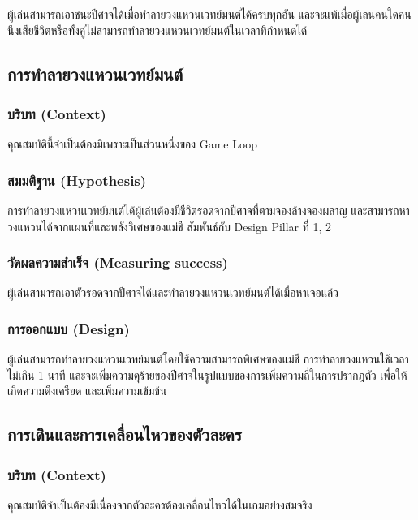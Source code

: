 ผู้เล่นสามารถเอาชนะปีศาจได้เมื่อทำลายวงแหวนเวทย์มนต์ได้ครบทุกอัน และจะแพ้เมื่อผู้เลนคนใดคนนึงเสียชีวิตหรือทั้งคู่ไม่สามารถทำลายวงแหวนเวทย์มนต์ในเวลาที่กำหนดได้

\subsection{การทำลายวงแหวนเวทย์มนต์}

\subsubsection{บริบท (Context)}

คุณสมบัตินี้จำเป็นต้องมีเพราะเป็นส่วนหนึ่งของ Game Loop

\subsubsection{สมมติฐาน (Hypothesis)}

การทำลายวงแหวนเวทย์มนต์ได้ผู้เล่นต้องมีชีวิตรอดจากปีศาจที่ตามจองล้างจองผลาญ และสามารถหาวงแหวนได้จากแผนที่และพลังวิเศษของแม่ชี สัมพันธ์กับ Design Pillar ที่ 1, 2

\subsubsection{วัดผลความสำเร็จ (Measuring success)}

ผู้เล่นสามารถเอาตัวรอดจากปีศาจได้และทำลายวงแหวนเวทย์มนต์ได้เมื่อหาเจอแล้ว

\subsubsection{การออกแบบ (Design)}

ผู้เล่นสามารถทำลายวงแหวนเวทย์มนต์โดยใช้ความสามารถพิเศษของแม่ชี การทำลายวงแหวนใช้เวลาไม่เกิน 1 นาที และจะเพิ่มความดุร้ายของปีศาจในรูปแบบของการเพิ่มความถี่ในการปรากฎตัว เพื่อให้เกิดความตึงเครียด และเพิ่มความเข้มข้น

\subsection{การเดินและการเคลื่อนไหวของตัวละคร}

\subsubsection{บริบท (Context)}

คุณสมบัติจำเป็นต้องมีเนื่องจากตัวละครต้องเคลื่อนไหวได้ในเกมอย่างสมจริง

